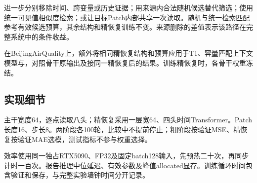 进一步分别移除时间、跨变量或历史证据；用来源内合法随机候选替代筛选；使用统一可见值相似度检索；或让目标Patch内部共享一次读取。随机与统一检索匹配参考有效候选预算，其余结构和精恢复训练不变。来源删除的差值表示该路径在完整系统中的条件收益。

在BeijingAirQuality上，额外将相同精恢复结构和预算应用于T1、容量匹配上下文模型与\Model{}，对照骨干原输出及接同一精恢复后的结果。训练精恢复时，各骨干权重冻结。

\subsection{实现细节}
主干宽度64，逐点读取八头；精恢复采用一层宽64、四头时间Transformer。Patch长度16、步长8。两阶段各100轮，\Model{}比较中不提前停止；粗阶段按验证MSE、精恢复按验证MAE选模，测试指标不参与权重选择。

效率使用同一独占RTX5090、FP32及固定batch128输入，先预热二十次，再同步计时一百次。报告推理中位延迟、有效参数及峰值allocated显存。训练循环时间包含验证和保存，与完整实验墙钟时间分开记录。
